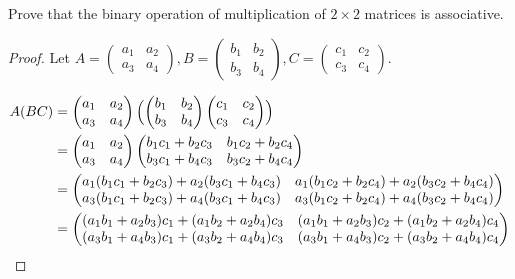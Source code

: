 \documentclass{article}
\begin{document}
Prove that the binary operation of multiplication of $2 \times 2$ matrices is associative.

\begin{proof}
    Let $A = \begin{pmatrix}a_1 & a_2\\a_3 & a_4\end{pmatrix}, B = \begin{pmatrix}b_1 & b_2\\b_3 & b_4\end{pmatrix}, C = \begin{pmatrix}c_1 & c_2\\c_3 & c_4\end{pmatrix}$.

    \begin{align*}
        A(BC) &= \begin{pmatrix}a_1 & a_2\\a_3 & a_4\end{pmatrix}\Bigl(\begin{pmatrix}b_1 & b_2\\b_3 & b_4\end{pmatrix}\begin{pmatrix}c_1 & c_2\\c_3 & c_4\end{pmatrix}\Bigr) \\ 
        &= \begin{pmatrix}a_1 & a_2\\a_3 & a_4\end{pmatrix}\begin{pmatrix}b_1 c_1 + b_2 c_3 & b_1 c_2 + b_2 c_4\\b_3 c_1 + b_4 c_3 & b_3 c_2 + b_4 c_4\end{pmatrix} \\
        &= \begin{pmatrix}
            a_1 (b_1 c_1 + b_2 c_3) + a_2 (b_3 c_1 + b_4 c_3) & a_1 (b_1 c_2 + b_2 c_4) + a_2 (b_3 c_2 + b_4 c_4)\\
            a_3 (b_1 c_1 + b_2 c_3) + a_4 (b_3 c_1 + b_4 c_3) & a_3 (b_1 c_2 + b_2 c_4) + a_4 (b_3 c_2 + b_4 c_4)
        \end{pmatrix} \\
        &= \begin{pmatrix}
            (a_1 b_1 + a_2 b_3) c_1 + (a_1 b_2 + a_2 b_4) c_3 & (a_1 b_1 + a_2 b_3) c_2 + (a_1 b_2 + a_2 b_4) c_4\\
            (a_3 b_1 + a_4 b_3) c_1 + (a_3 b_2 + a_4 b_4) c_3 & (a_3 b_1 + a_4 b_3) c_2 + (a_3 b_2 + a_4 b_4) c_4

\end{pmatrix}
\end{align*}
\end{proof}
\end{document}
